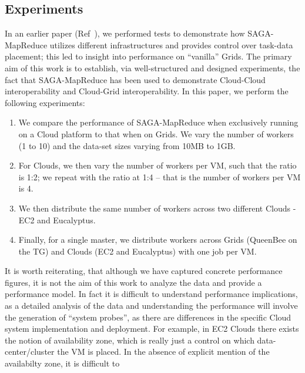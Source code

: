 \documentclass[conference,final]{IEEEtran}
\newcommand{\sagamapreduce }{SAGA-MapReduce }
\begin{document}
\subsection{Experiments} 
In an earlier paper (Ref~\cite{saga_ccgrid09}), we performed tests to
demonstrate how \sagamapreduce utilizes different infrastructures and
provides control over task-data placement; this led to insight into
performance on ``vanilla'' Grids. The primary aim of this work is to
establish, via well-structured and designed experiments, the fact that
\sagamapreduce has been used to demonstrate Cloud-Cloud
interoperability and Cloud-Grid interoperability. In this paper, we
perform the following experiments:
\begin{enumerate}
\item We compare the performance of \sagamapreduce when exclusively
  running on a Cloud platform to that when on Grids. We vary the
  number of workers (1 to 10) and the data-set sizes varying from 10MB
  to 1GB.
\item For Clouds, we then vary the number of workers per VM, such that
  the ratio is 1:2; we repeat with the ratio at 1:4 -- that is the
  number of workers per VM is 4.
\item We then distribute the same number of workers across two
  different Clouds - EC2 and Eucalyptus.
\item Finally, for a single master, we distribute workers across Grids
  (QueenBee on the TG) and Clouds (EC2 and Eucalyptus) with one job
  per VM.
\end{enumerate}
It is worth reiterating, that although we have captured concrete
performance figures, it is not the aim of this work to analyze the
data and provide a performance model. In fact it is difficult to
understand performance implications, as a detailed analysis of the
data and understanding the performance will involve the generation of
``system probes'', as there are differences in the specific Cloud
system implementation and deployment.  For example, in EC2 Clouds %
there exists the notion of availability zone, which is really just a
control on which data-center/cluster the VM is placed. In the absence
of explicit mention of the availabilty zone, it is difficult to
\end{document}
